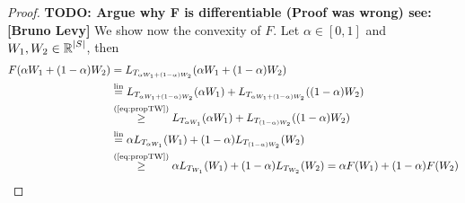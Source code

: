\documentclass[
     12pt,         %
     a4paper,      %
     BCOR=10mm,     %
     DIV=14,        %
     ]{scrreprt}
\begin{document}
    \begin{proof}[Proof]
        \textbf{TODO:  Argue why F is differentiable (Proof was wrong) see: [Bruno Levy]}
        We show now the convexity of $F$. Let $\alpha \in [0,1]$ and $W_1, W_2 \in \operatorname{\mathbb{R}}^{|S|}$, then
        \begin{align*}
            F(\alpha W_1 + (1- \alpha)W_2) &= L_{T_{\alpha W_1 + (1- \alpha)W_2}}(\alpha W_1 + (1- \alpha)W_2) \\
                                        &\overset {\text{lin}}= L_{T_{\alpha W_1 + (1- \alpha)W_2}}(\alpha W_1) + L_{T_{\alpha W_1 + (1- \alpha)W_2}}((1-\alpha) W_2)\\
                                        &\overset {\text{(\ref{eq:propTW})}}\ge L_{T_{\alpha W_1}}(\alpha W_1) + L_{T_{(1-\alpha) W_2}}((1- \alpha) W_2) \\
                                        &\overset {\text{lin}}= \alpha L_{T_{\alpha W_1}}(W_1) + (1-\alpha) L_{T_{(1-\alpha) W_2}}(W_2) \\ 
                                        &\overset {\text{(\ref{eq:propTW})}}\ge \alpha L_{T_{W_1}}(W_1) + (1-\alpha) L_{T_{W_2}}(W_2) = \alpha F(W_1) + (1-\alpha) F(W_2)
        \end{align*}
    \end{proof}
    
\end{document}
